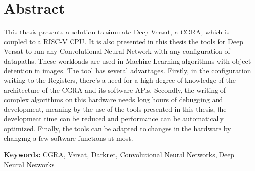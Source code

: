 
\section*{Abstract}


This thesis presents a solution to simulate Deep Versat, a CGRA, which is coupled to a RISC-V CPU.
It is also presented in this thesis the tools for Deep Versat to run any Convolutional Neural Network with any configuration of datapaths.
These workloads are used in Machine Learning algorithms with object detention in images. The tool has several advantages.
Firstly, in the configuration writing to the Registers, there's a need for a high degree of knowledge of the architecture of the CGRA and its software
APIs.
Secondly, the writing of complex algorithms on this hardware needs long hours of debugging and development, meaning by the use of the tools
presented in this thesis, the development time can be reduced and performance can be automatically optimized.
Finally, the tools can be adapted to changes in the hardware by changing a few software functions at most.

\vfill

\textbf{\Large Keywords:} CGRA, Versat, Darknet, Convolutional Neural Networks, Deep Neural Networks


